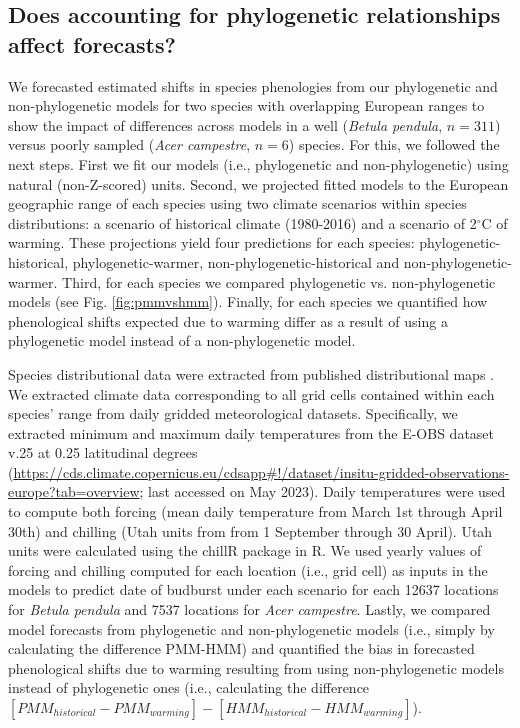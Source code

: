 \documentclass[11pt]{article}
\begin{document}
\subsection{Does accounting for phylogenetic relationships affect forecasts?}
We forecasted estimated shifts in species phenologies from our phylogenetic and non-phylogenetic models for two species with overlapping European ranges to show the impact of differences across models in a well (\emph{Betula pendula}, $n=311$) versus poorly sampled  (\emph{Acer campestre}, $n=6$) species. For this, we followed the next steps. First we fit our models (i.e., phylogenetic and non-phylogenetic) using natural (non-Z-scored) units. Second, we projected fitted models to the European geographic range of each species using two climate scenarios within species distributions: a scenario of historical climate (1980-2016) and a scenario of 2$^{\circ}$C of warming. These projections yield four predictions for each species: phylogenetic-historical, phylogenetic-warmer, non-phylogenetic-historical and non-phylogenetic-warmer. Third, for each species we compared phylogenetic vs. non-phylogenetic models (see Fig. \ref{fig:pmmvshmm}). Finally, for each species we quantified how phenological shifts expected due to warming differ as a result of using a phylogenetic model instead of a non-phylogenetic model.  

Species distributional data were extracted from published distributional maps \citep{caudullo2017chorological}. We extracted climate data corresponding to all grid cells contained within each species' range from daily gridded meteorological datasets. Specifically, we extracted minimum and maximum daily temperatures from the E-OBS dataset v.25 at 0.25 latitudinal degrees (\url{https://cds.climate.copernicus.eu/cdsapp#!/dataset/insitu-gridded-observations-europe?tab=overview}; last accessed on May 2023). Daily temperatures were used to compute both forcing (mean daily temperature from March 1st through April 30th) and  chilling (Utah units from from 1 September through 30 April). Utah units were calculated using the chillR package in R. We used yearly values of forcing and chilling computed for each location (i.e., grid cell) as inputs in the models to predict date of budburst under each scenario for each 12637 locations for \emph{Betula pendula} and 7537 locations for \emph{Acer campestre}. Lastly, we compared model forecasts from phylogenetic and non-phylogenetic models (i.e., simply by calculating the difference PMM-HMM) and quantified the bias in forecasted phenological shifts due to warming resulting from using non-phylogenetic models instead of phylogenetic ones (i.e., calculating the difference $[PMM_{historical} -PMM_{warming}]-[HMM_{historical}-HMM_{warming}]$).%
\end{document}

